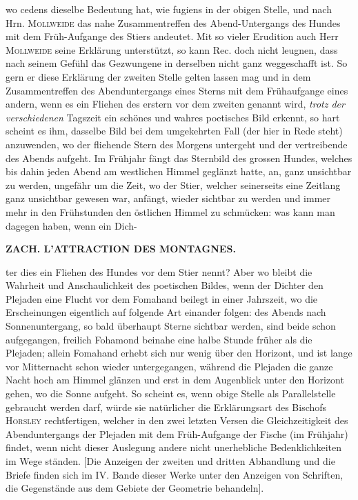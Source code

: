 \noindent wo cedens dieselbe Bedeutung hat, wie fugiens in der obigen Stelle, und nach Hrn. \textsc{Mollweide} das nahe Zusammentreffen des Abend-Untergangs des Hundes mit dem Früh-Aufgange des Stiers andeutet. Mit so vieler Erudition auch Herr \textsc{Mollweide} seine Erklärung unterstützt, so kann Rec. doch nicht leugnen, dass nach seinem Gefühl das Gezwungene in derselben nicht ganz weggeschafft ist. So gern er diese Erklärung der zweiten Stelle gelten lassen mag und in dem Zusammentreffen des Abenduntergangs eines Sterns mit dem Frühaufgange eines andern, wenn es ein Fliehen des erstern vor dem zweiten genannt wird, \emph{trotz der verschiedenen} Tagszeit ein schönes und wahres poetisches Bild erkennt, so hart scheint es ihm, dasselbe Bild bei dem umgekehrten Fall (der hier in Rede steht) anzuwenden, wo der fliehende Stern des Morgens untergeht und der vertreibende des Abends aufgeht. Im Frühjahr fängt das Sternbild des grossen Hundes, welches bis dahin jeden Abend am westlichen Himmel geglänzt hatte, an, ganz unsichtbar zu werden, ungefähr um die Zeit, wo der Stier, welcher seinerseits eine Zeitlang ganz unsichtbar gewesen war, anfängt, wieder sichtbar zu werden und immer mehr in den Frühstunden den östlichen Himmel zu schmücken: was kann man dagegen haben, wenn ein Dich-\par
\clearpage
{}
\noindent\makebox[10mm][l]{}%
\parbox[b]{\dimexpr\textwidth-20mm\relax}{\centering\small\textbf{ZACH. L’ATTRACTION DES MONTAGNES.}}%
\par\nobreak\medskip
\noindent ter dies ein Fliehen des Hundes vor dem Stier nennt? Aber wo bleibt die Wahrheit und Anschaulichkeit des poetischen Bildes, wenn der Dichter den Plejaden eine Flucht vor dem Fomahand beilegt in einer Jahrszeit, wo die Erscheinungen eigentlich auf folgende Art einander folgen: des Abends nach Sonnenuntergang, so bald überhaupt Sterne sichtbar werden, sind beide schon aufgegangen, freilich Fohamond beinahe eine halbe Stunde früher als die Plejaden; allein Fomahand erhebt sich nur wenig über den Horizont, und ist lange vor Mitternacht schon wieder untergegangen, während die Plejaden die ganze Nacht hoch am Himmel glänzen und erst in dem Augenblick unter den Horizont gehen, wo die Sonne aufgeht. So scheint es, wenn obige Stelle als Parallelstelle gebraucht werden darf, würde sie natürlicher die Erklärungsart des Bischofs \textsc{Horsley} rechtfertigen, welcher in den zwei letzten Versen die Gleichzeitigkeit des Abenduntergangs der Plejaden mit dem Früh-Aufgange der Fische (im Frühjahr) findet, wenn nicht dieser Auslegung andere nicht unerhebliche Bedenklichkeiten im Wege ständen. [Die Anzeigen der zweiten und dritten Abhandlung und die Briefe finden sich im IV. Bande dieser Werke unter den Anzeigen von Schriften, die Gegenstände aus dem Gebiete der Geometrie behandeln].
